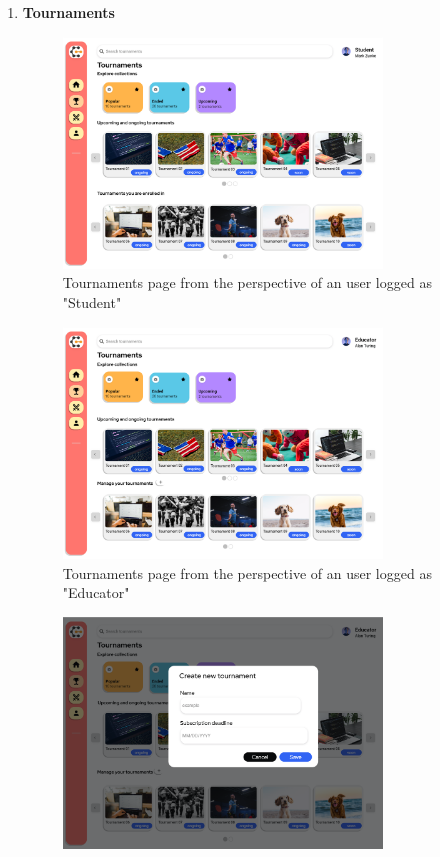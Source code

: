 \begin{enumerate}[label=\textbf{F\arabic*)}]
    \item \textbf{Tournaments}\\
    \begin{figure}[H]
        \centering
        \includegraphics[width=0.8\textwidth]{Mockups/4_student_tournaments.png}
        \caption{Tournaments page from the perspective of an user logged as "Student"}
    \end{figure}
    \begin{figure}[H]
        \centering
        \includegraphics[width=0.8\textwidth]{Mockups/5_educator_tournaments.png}
        \caption{Tournaments page from the perspective of an user logged as "Educator"}
    \end{figure}
    \begin{figure}[H]
        \centering
        \includegraphics[width=0.8\textwidth]{Mockups/6_educator_create_tournament.png}

\end{figure}
\end{enumerate}
